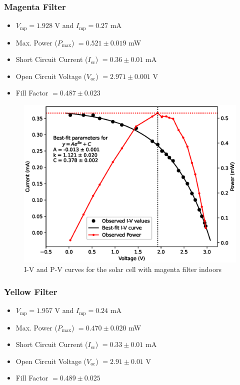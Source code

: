 
\subsubsection{Magenta Filter}
\begin{itemize}
    \item $V_\text{mp} = 1.928$ V and $I_\text{mp} = 0.27$ mA
    \item Max. Power ($P_\text{max}$) $= 0.521 \pm 0.019 $ mW
    \item Short Circuit Current ($I_\text{sc}$) $= 0.36 \pm 0.01$ mA
    \item Open Circuit Voltage ($V_\text{oc}$) $= 2.971 \pm 0.001$ V
    \item Fill Factor $= 0.487 \pm 0.023$
\end{itemize}

\begin{figure}[H]
    \centering
    \includegraphics[width=1\columnwidth]{images/in/pink.eps}
    \caption{I-V and P-V curves for the solar cell with magenta filter indoors}
\end{figure}


\subsubsection{Yellow Filter}
\begin{itemize}
    \item $V_\text{mp} = 1.957$ V and $I_\text{mp} = 0.24$ mA
    \item Max. Power ($P_\text{max}$) $= 0.470 \pm 0.020 $ mW
    \item Short Circuit Current ($I_\text{sc}$) $= 0.33 \pm 0.01$ mA
    \item Open Circuit Voltage ($V_\text{oc}$) $= 2.91 \pm 0.01$ V
    \item Fill Factor $= 0.489 \pm 0.025$
\end{itemize}

